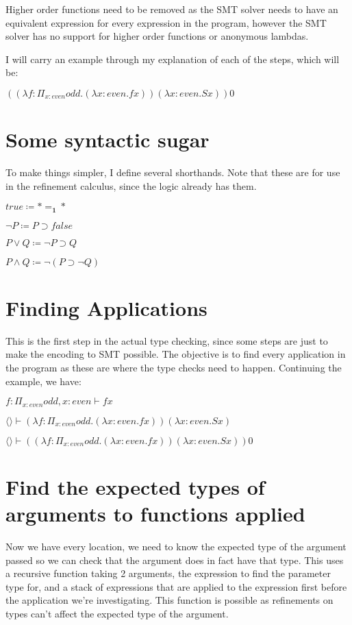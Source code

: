 \documentclass[12pt,a4paper,titlepage]{article}
\begin{document}
    Higher order functions need to be removed as the SMT solver needs to have an equivalent expression
    for every expression in the program, however the SMT solver has no support for higher order functions
    or anonymous lambdas.

    I will carry an example through my explanation of each of the steps, which will be:

    $((\lambda f: \Pi_{x: even} odd . (\lambda x: even . f x)) (\lambda x: even . S x)) 0$

    \section{Some syntactic sugar}
    To make things simpler, I define several shorthands. Note that these are for use in the refinement calculus, since the logic already has them.

    $true \coloneqq \ast =_\textbf{1} \ast$

    $\neg P \coloneqq P \supset false$

    $P \lor Q \coloneqq \neg P \supset Q$

    $P \land Q \coloneqq \neg (P \supset \neg Q)$

    \section{Finding Applications}

    This is the first step in the actual type checking, since some steps are just to make the encoding to SMT
    possible.
    The objective is to find every application in the program as these are where the type checks need to happen.
    Continuing the example, we have:

    $f: \Pi_{x: even} odd, x: even \vdash f x$

    $\langle \rangle \vdash (\lambda f: \Pi_{x: even} odd . (\lambda x: even . f x)) (\lambda x: even . S x)$

    $\langle \rangle \vdash ((\lambda f: \Pi_{x: even} odd . (\lambda x: even . f x)) (\lambda x: even . S x)) 0$

    \section{Find the expected types of arguments to functions applied}

    Now we have every location, we need to know the expected type of the argument passed so we can check that
    the argument does in fact have that type.
    This uses a recursive function taking 2 arguments, the expression to find the parameter type for,
    and a stack of expressions that are applied to the expression first before the application we're investigating.
    This function is possible as refinements on types can't affect the expected type of the argument.
\end{document}
